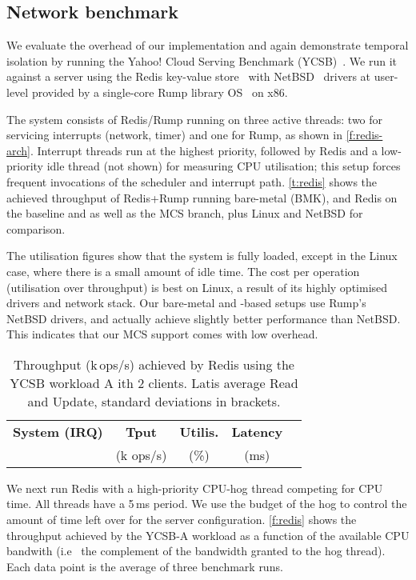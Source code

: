 \subsection{Network benchmark} 

We evaluate the overhead of our implementation and
again demonstrate temporal isolation by running the Yahoo! Cloud Serving Benchmark
(YCSB)~\citep{Cooper_STRS_10}.
 We run it against a server using the Redis
 key-value store~\citep{redis:url} with NetBSD~\citep{NetBSD:url} drivers at user-level provided
 by a single-core Rump library OS~\citep{Kantee_Cormack_14} on x86.

The system consists of Redis/Rump running on three active \selfour threads: two for servicing interrupts
(network, timer) and one for Rump, as shown in \autoref{f:redis-arch}.
Interrupt threads run at the highest priority, followed by Redis and
a low-priority idle thread (not shown) for measuring CPU utilisation;
this setup forces frequent invocations of the scheduler and interrupt
path. \autoref{t:redis} shows the achieved throughput of Redis+Rump
running  bare-metal (BMK), and Redis on the \selfour baseline and as well as the MCS
branch, plus Linux and NetBSD for comparison.

The utilisation figures show that the system is fully loaded, except
in the Linux case, where there is a small amount of idle time. The
cost per operation (utilisation over throughput) is best on Linux, a
result of its highly optimised drivers and network stack. Our
bare-metal and \selfour-based setups use Rump's NetBSD drivers, and
actually achieve slightly better performance than NetBSD. This
indicates that our MCS support comes with low overhead.


\begin{table}[t]\centering
      \begin{tabular}{|c|c|c|c|c|}
        \hline
        \textbf{System (IRQ)}  & \textbf{Tput} & \textbf{Utilis.} &  \textbf{Latency} \\
                               & (k ops/s)     &  (\%)            &   (ms)            \\
        \hline
      
    \end{tabular}
    \caption{Throughput (k\,ops/s) achieved by Redis using the YCSB
      workload A ith 2 clients.  Latis average Read and Update,
      standard deviations in brackets.}
    \label{t:redis}
\end{table}

We next run Redis with a high-priority CPU-hog thread competing for CPU time. All threads have a
5\,ms period. We use the budget of the hog to control the amount of time left over
for the server configuration. \autoref{f:redis} shows the throughput
achieved by the YCSB-A workload as a function of the available CPU
bandwith (i.e \ the complement of the bandwidth granted to the hog
thread). Each data point is the average of three benchmark runs.

